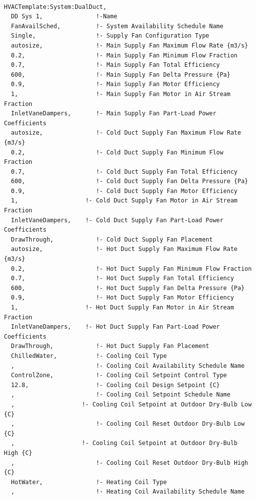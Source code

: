 \begin{lstlisting}

HVACTemplate:System:DualDuct,
  DD Sys 1,               !-Name
  FanAvailSched,          !- System Availability Schedule Name
  Single,                 !- Supply Fan Configuration Type  
  autosize,               !- Main Supply Fan Maximum Flow Rate {m3/s}
  0.2,                    !- Main Supply Fan Minimum Flow Fraction
  0.7,                    !- Main Supply Fan Total Efficiency
  600,                    !- Main Supply Fan Delta Pressure {Pa}
  0.9,                    !- Main Supply Fan Motor Efficiency
  1,                      !- Main Supply Fan Motor in Air Stream Fraction
  InletVaneDampers,       !- Main Supply Fan Part-Load Power Coefficients
  autosize,               !- Cold Duct Supply Fan Maximum Flow Rate {m3/s}
  0.2,                    !- Cold Duct Supply Fan Minimum Flow Fraction
  0.7,                    !- Cold Duct Supply Fan Total Efficiency
  600,                    !- Cold Duct Supply Fan Delta Pressure {Pa}
  0.9,                    !- Cold Duct Supply Fan Motor Efficiency
  1,                   !- Cold Duct Supply Fan Motor in Air Stream Fraction
  InletVaneDampers,    !- Cold Duct Supply Fan Part-Load Power Coefficients
  DrawThrough,            !- Cold Duct Supply Fan Placement
  autosize,               !- Hot Duct Supply Fan Maximum Flow Rate {m3/s}
  0.2,                    !- Hot Duct Supply Fan Minimum Flow Fraction
  0.7,                    !- Hot Duct Supply Fan Total Efficiency
  600,                    !- Hot Duct Supply Fan Delta Pressure {Pa}
  0.9,                    !- Hot Duct Supply Fan Motor Efficiency
  1,                   !- Hot Duct Supply Fan Motor in Air Stream Fraction
  InletVaneDampers,    !- Hot Duct Supply Fan Part-Load Power Coefficients
  DrawThrough,            !- Hot Duct Supply Fan Placement
  ChilledWater,           !- Cooling Coil Type
  ,                       !- Cooling Coil Availability Schedule Name
  ControlZone,            !- Cooling Coil Setpoint Control Type
  12.8,                   !- Cooling Coil Design Setpoint {C}
  ,                       !- Cooling Coil Setpoint Schedule Name
  ,                   !- Cooling Coil Setpoint at Outdoor Dry-Bulb Low {C}
  ,                       !- Cooling Coil Reset Outdoor Dry-Bulb Low {C}
  ,                   !- Cooling Coil Setpoint at Outdoor Dry-Bulb High {C}
  ,                       !- Cooling Coil Reset Outdoor Dry-Bulb High {C}
  HotWater,               !- Heating Coil Type
  ,                       !- Heating Coil Availability Schedule Name

\end{lstlisting}
